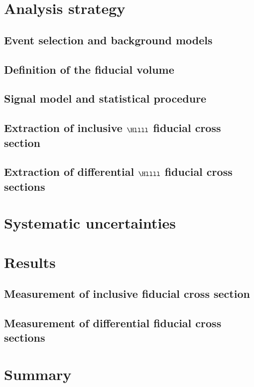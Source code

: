 \begin{table}[htb]
\begin{center}
  \end{center}
%
  \small
  \caption{  MC simulation datasets used for the background processes (${\rm Z}$ stands for ${\rm Z}$, ${\rm Z}^*$, $\gamma^*$);
  In MC samples with label ``t/u channels only'' only the t/u channels are simulated in the $qq \to 4\ell$ process and these samples are used for the $Z \to 4\ell$ analysis.
  The ``t/u channels only'' samples have lower cut in $m_{ll}$ of 1 GeV, while all other $qq \to ZZ$ and $gg \to ZZ$ samples have lower cut in $m_{ll}$ of 4 GeV. In case of the $gg \to ZZ$ background, the overall NLO k-factor of 2.66 is included, as discussed in Section~\ref{sec:EventsBackgrounds}.}
  \label{tab:MCsamplesBkg}
%
\end{table}

\section{Analysis strategy}\label{sec:AnalysisStrategy} 
\subsection{Event selection and background models} 
\subsection{Definition of the fiducial volume}
\subsection{Signal model and statistical procedure}
\subsection{Extraction of inclusive \texorpdfstring{$\Hllll$}{H to 4l} fiducial cross section}
\subsection{Extraction of differential \texorpdfstring{$\Hllll$}{H to 4l} fiducial cross sections}
\section{Systematic uncertainties}\label{sec:Systematics}
\section{Results}\label{sec:Results}
\subsection{Measurement of inclusive fiducial cross section}
\subsection{Measurement of differential fiducial cross sections}
\section{Summary}\label{sec:Summary}

